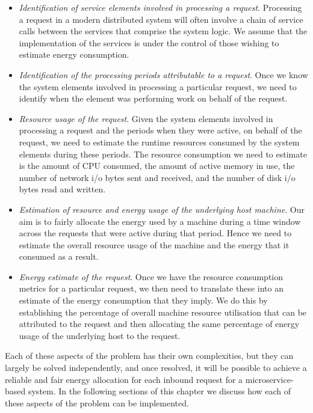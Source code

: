 \begin{itemize}

\item \emph{Identification of service elements involved in processing a request}.  Processing a request in a modern distributed system will often involve a chain of service calls between the services that comprise the system logic.  We assume that the implementation of the services is under the control of those wishing to estimate energy consumption.

\item \emph{Identification of the processing periods attributable to a request}.  Once we know the system elements involved in processing a particular request, we need to identify when the element was performing work on behalf of the request.

\item \emph{Resource usage of the request}.  Given the system elements involved in processing a request and the periods when they were active, on behalf of the request, we need to estimate the runtime resources consumed by the system elements during these periods.  The resource consumption we need to estimate is the amount of CPU consumed, the amount of active memory in use, the number of network i/o bytes sent and received, and the number of disk i/o bytes read and written.

\item \emph{Estimation of resource and energy usage of the underlying host machine}.  Our aim is to fairly allocate the energy used by a machine during a time window across the requests that were active during that period.  Hence we need to estimate the overall resource usage of the machine and the energy that it consumed as a result.

\item \emph{Energy estimate of the request}.  Once we have the resource consumption metrics for a particular request, we then need to translate these into an estimate of the energy consumption that they imply.  We do this by establishing the percentage of overall machine resource utilisation that can be attributed to the request and then allocating the same percentage of energy usage of the underlying host to the request.

\end{itemize}

Each of these aspects of the problem has their own complexities, but they can largely be solved independently, and once resolved, it will be possible to achieve a reliable and fair energy allocation for each inbound request for a microservice-based system.  In the following sections of this chapter we discuss how each of these aspects of the problem can be implemented.

